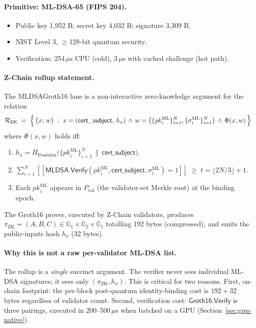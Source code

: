 \paragraph{Primitive: ML-DSA-65 (FIPS 204).}
\begin{itemize}[leftmargin=2em,nosep]
\item Public key 1{,}952 B; secret key 4{,}032 B; signature 3{,}309 B.
\item NIST Level 3, $\geq$128-bit quantum security.
\item Verification: 254\,$\mu$s CPU (cold), 3\,$\mu$s with cached
      challenge (hot path).
\end{itemize}

\paragraph{Z-Chain rollup statement.}
The MLDSAGroth16 lane is a non-interactive zero-knowledge argument for
the relation
\[
\mathcal{R}_{\mathrm{ZK}} \;=\; \Bigl\{\,
\bigl(x;\, w\bigr)
\;:\;
x = (\mathsf{cert\_subject},\, h_x)
\,\land\,
w = \bigl(\{\mathit{pk}_i^{\mathrm{ML}}\}_{i=1}^N,
\{\sigma_i^{\mathrm{ML}}\}_{i=1}^N\bigr)
\,\land\,\Phi(x, w)\,\Bigr\}
\]
where $\Phi(x, w)$ holds iff:
\begin{enumerate}[leftmargin=2em,nosep]
\item $h_x = H_{\text{Poseidon}}\bigl(\{\mathit{pk}_i^{\mathrm{ML}}\}_{i=1}^N
      \,\|\, \mathsf{cert\_subject}\bigr)$.
\item $\sum_{i=1}^{N} [\![ \mathsf{MLDSA.Verify}(\mathit{pk}_i^{\mathrm{ML}},
      \mathsf{cert\_subject}, \sigma_i^{\mathrm{ML}}) = 1 ]\!] \;\geq\;
      t = \lfloor 2N/3 \rfloor + 1$.
\item Each $\mathit{pk}_i^{\mathrm{ML}}$ appears in
      $P_\text{val}$ (the validator-set Merkle root) at the binding
      epoch.
\end{enumerate}

The Groth16 prover, executed by Z-Chain validators, produces
$\pi_{\mathrm{ZK}} = (A, B, C) \in \mathbb{G}_1 \times \mathbb{G}_2
\times \mathbb{G}_1$ totalling 192 bytes (compressed), and emits the
public-inputs hash $h_x$ (32 bytes).

\paragraph{Why this is not a raw per-validator ML-DSA list.}
The rollup is a \emph{single} succinct argument. The verifier never sees
individual ML-DSA signatures; it sees only $(\pi_{\mathrm{ZK}}, h_x)$.
This is critical for two reasons. First, on-chain footprint: the per-block
post-quantum identity-binding cost is $192 + 32$ bytes regardless of
validator count. Second, verification cost: $\mathsf{Groth16.Verify}$ is
three pairings, executed in 200--500\,$\mu$s when batched on a GPU
(Section~\ref{sec:gpu-native}).

